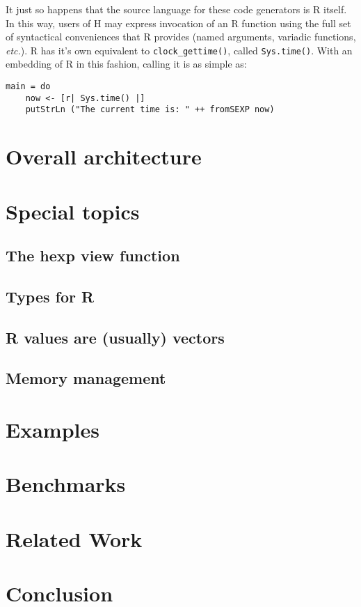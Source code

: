 \documentclass[preprint,authoryear]{sigplanconf}
\begin{document}
It just so happens that the source language for these code generators
is R itself. In this way, users of H may express invocation of an
R function using the full set of syntactical conveniences that
R provides (named arguments, variadic functions, {\em etc.}). R has
it's own equivalent to \verb|clock_gettime()|, called
\verb|Sys.time()|. With an embedding of R in this fashion, calling it
is as simple as:
\begin{verbatim}
main = do
    now <- [r| Sys.time() |]
    putStrLn ("The current time is: " ++ fromSEXP now)
\end{verbatim}

\section{Overall architecture}

\section{Special topics}

\subsection{The hexp view function}

\subsection{Types for R}

\subsection{R values are (usually) vectors}

\subsection{Memory management}

\section{Examples}

\section{Benchmarks}

\section{Related Work}

\section{Conclusion}

\acks



\end{document}
